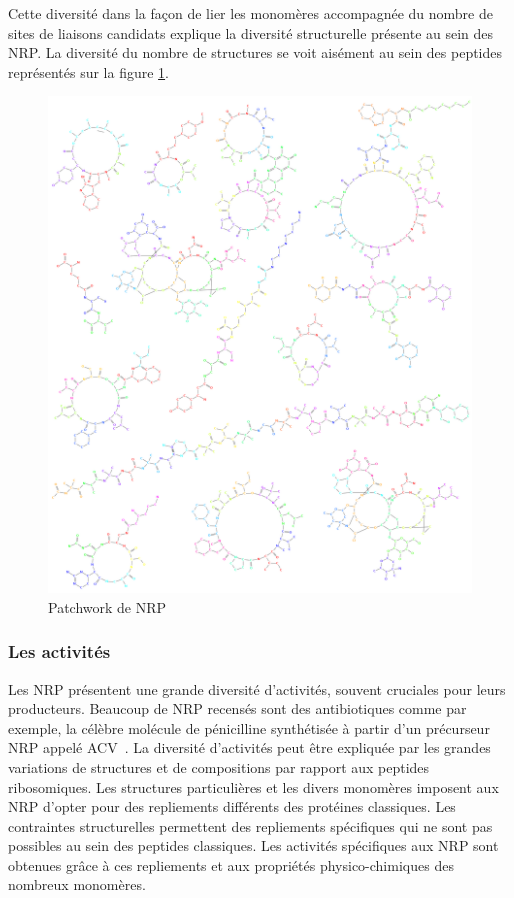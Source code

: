 Cette diversité dans la façon de lier les monomères accompagnée du nombre de sites de liaisons candidats explique la diversité structurelle présente au sein des NRP.
La diversité du nombre de structures se voit aisément au sein des peptides représentés sur la figure \ref{peps_example}.

\begin{figure}[h!]
  \begin{center}
    \includegraphics[width=450px]{Figures/bio/Intro/NRPs/peps.png}
    \caption{\label{peps_example}Patchwork de NRP}
  \end{center}
\end{figure}


\subsubsection{Les activités}

Les NRP présentent une grande diversité d'activités, souvent cruciales pour leurs producteurs.
Beaucoup de NRP recensés sont des antibiotiques comme par exemple, la célèbre molécule de pénicilline synthétisée à partir d'un précurseur NRP appelé ACV~\cite{queener_molecular_1990}.
La diversité d'activités peut être expliquée par les grandes variations de structures et de compositions par rapport aux peptides ribosomiques.
Les structures particulières et les divers monomères imposent aux NRP d'opter pour des repliements différents des protéines classiques.
Les contraintes structurelles permettent des repliements spécifiques qui ne sont pas possibles au sein des peptides classiques.
Les activités spécifiques aux NRP sont obtenues grâce à ces repliements et aux propriétés physico-chimiques des nombreux monomères.


